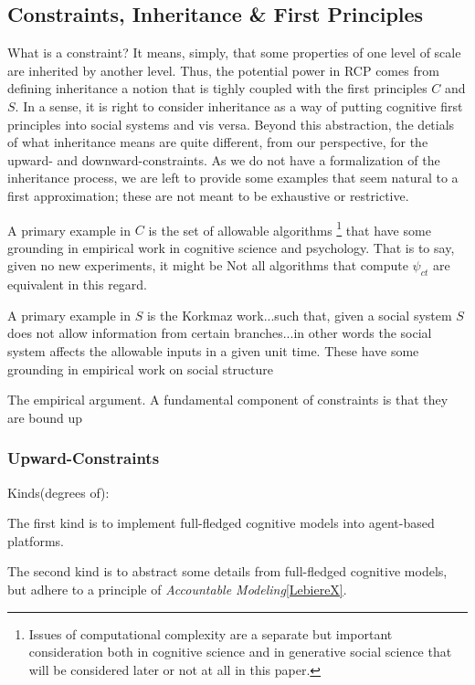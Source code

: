 \documentclass{article}
\begin{document}
\subsection{Constraints, Inheritance \& First Principles}
What is a constraint?  It means, simply, that some properties of one level of scale are inherited by another level.  Thus, the potential power in RCP comes from defining inheritance a notion that is tighly coupled with the first principles $C$ and $S$. In a sense, it is right to consider inheritance as a way of putting cognitive first principles into social systems and vis versa. Beyond this abstraction, the detials of what inheritance means are quite different, from our perspective, for the upward- and downward-constraints.  As we do not have a formalization of the inheritance process, we are left to provide some examples that seem natural to a first approximation; these are not meant to be exhaustive or restrictive.

A primary example in $C$ is the set of allowable algorithms \footnote{Issues of computational complexity are a separate but important consideration both in cognitive science and in generative social science that will be considered later or not at all in this paper.} that have some grounding in empirical work in cognitive science and psychology.  That is to say, given no new experiments, it might be   Not all algorithms that compute $\psi_{ct}$ are equivalent in this regard.  

A primary example in $S$ is the Korkmaz work...such that, given a social system $S$ does not allow information from certain branches...in other words the social system affects the allowable inputs in a given unit time.  These have some grounding in empirical work on social structure
 
The empirical argument.  A fundamental component of constraints is that they are bound up



\subsubsection{Upward-Constraints}


Kinds(degrees of):

The first kind is to implement full-fledged cognitive models into agent-based platforms.

The second kind is to abstract some details from full-fledged cognitive models, but adhere to a principle of \textit{Accountable Modeling}\ref{LebiereX}.
\end{document}
